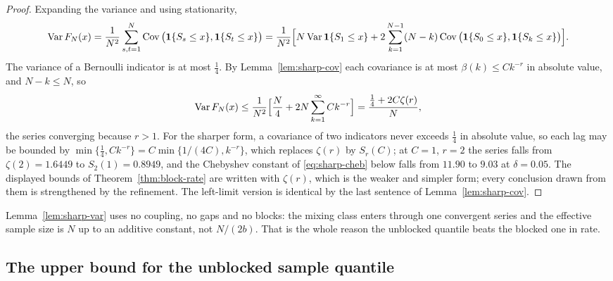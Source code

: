 \documentclass[../../../main.tex]{subfiles}
\begin{document}
\begin{proof}
Expanding the variance and using stationarity,
\[
\operatorname{Var} F_N(x)=\frac1{N^2}\sum_{s,t=1}^N\operatorname{Cov}\big(\mathbf{1}\{S_s\le x\},\mathbf{1}\{S_t\le x\}\big)
=\frac1{N^2}\Big[N\operatorname{Var}\mathbf{1}\{S_1\le x\}+2\sum_{k=1}^{N-1}(N-k)\operatorname{Cov}\big(\mathbf{1}\{S_0\le x\},\mathbf{1}\{S_k\le x\}\big)\Big].
\]
The variance of a Bernoulli indicator is at most $\tfrac14$. By Lemma~\ref{lem:sharp-cov} each covariance is at most $\beta(k)\le Ck^{-r}$ in absolute value, and $N-k\le N$, so
\[
\operatorname{Var} F_N(x)\le\frac1{N^2}\Big[\frac N4+2N\sum_{k=1}^{\infty}Ck^{-r}\Big]=\frac{\tfrac14+2C\zeta(r)}N ,
\]
the series converging because $r>1$. For the sharper form, a covariance of two indicators never exceeds $\tfrac14$ in absolute value, so each lag may be bounded by $\min\{\tfrac14,Ck^{-r}\}=C\min\{1/(4C),k^{-r}\}$, which replaces $\zeta(r)$ by $S_r(C)$; at $C=1$, $r=2$ the series falls from $\zeta(2)=1.6449$ to $S_2(1)=0.8949$, and the Chebyshev constant of \eqref{eq:sharp-cheb} below falls from $11.90$ to $9.03$ at $\delta=0.05$. The displayed bounds of Theorem~\ref{thm:block-rate} are written with $\zeta(r)$, which is the weaker and simpler form; every conclusion drawn from them is strengthened by the refinement. The left-limit version is identical by the last sentence of Lemma~\ref{lem:sharp-cov}.
\end{proof}

\begin{remark}\label{rem:sharp-var}
Lemma~\ref{lem:sharp-var} uses no coupling, no gaps and no blocks: the mixing class enters through one convergent series and the effective sample size is $N$ up to an additive constant, not $N/(2b)$. That is the whole reason the unblocked quantile beats the blocked one in rate.
\end{remark}

\subsection{The upper bound for the unblocked sample quantile}
\end{document}
